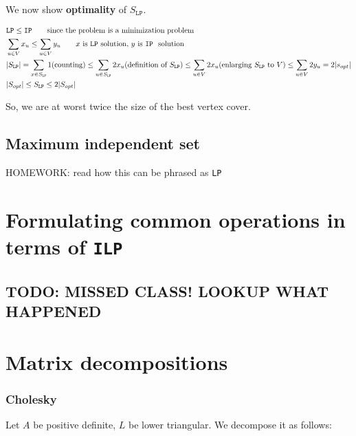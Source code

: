 \documentclass[11pt]{book}
\newcommand{\ilp}{\texttt{ILP} }
\newcommand{\ip}{\texttt{IP} }
\newcommand{\lp}{\texttt{LP}}
\begin{document}
We now show \textbf{optimality} of $S_\lp$.

\begin{align*}
    &\lp \leq \ip \qquad \text{since the problem is a minimization problem} \\
    &\sum_{u \in V} x_u \leq \sum_{u \in V} y_u \qquad \text{$x$ is \lp~solution, $y$ is \ip~solution} \\
    &|S_\lp| = \sum_{x \in S_\lp} 1 \text{(counting})\leq 
    \sum_{u\in S_\lp} 2 x_u  \text{(definition of $S_\lp$)} \leq
    \sum_{u \in V} 2 x_u \text{(enlarging $S_\lp$ to $V$)} \leq
        \sum_{u \in V} 2 y_u = 2|s_{opt}| \\
    &|S_{opt}| \leq S_\lp \leq 2 |S_{opt}|
\end{align*}

So, we are at worst twice the size of the best vertex cover.

\section{Maximum independent set}
HOMEWORK: read how this can be phrased as \lp

\chapter{Formulating common operations in terms of \ilp}

\section{TODO: MISSED CLASS! LOOKUP WHAT HAPPENED}

\chapter{Matrix decompositions}
\subsection{Cholesky}
Let $A$ be positive definite, $L$  be lower triangular. We decompose it as follows:
\end{document}
